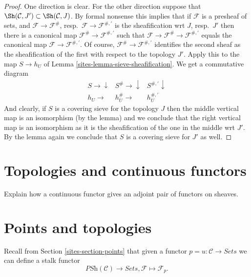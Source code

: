 \begin{proof}

One direction is clear. For the other direction suppose that
$\Sh(\mathcal{C}, J') \subset \Sh(\mathcal{C}, J)$.
By formal nonsense this implies
that if $\mathcal{F}$ is a presheaf of sets,
and $\mathcal{F} \to \mathcal{F}^\#$,
resp.\ $\mathcal{F} \to \mathcal{F}^{\#, \prime}$
is the sheafification wrt $J$, resp.\ $J'$ then there
is a canonical map $\mathcal{F}^\# \to \mathcal{F}^{\#, \prime}$
such that
$\mathcal{F} \to \mathcal{F}^\# \to \mathcal{F}^{\#, \prime}$
equals the canonical map $\mathcal{F} \to \mathcal{F}^{\#, \prime}$.
Of course, $\mathcal{F}^\# \to \mathcal{F}^{\#, \prime}$
identifies the second sheaf as the sheafification of the first
with respect to the topology $J'$.
Apply this to the map $S \to h_U$ of
Lemma \ref{sites-lemma-sieve-sheafification}. We get a commutative
diagram
$$
\begin{array}{ccc}S \longrightarrow\downarrow & S^\# \longrightarrow\downarrow & S^{\#, \prime} \downarrow \\ h_U \longrightarrow & h_U^\# \longrightarrow & h_U^{\#, \prime}\end{array}
$$
And clearly, if $S$ is a covering sieve for the topology $J$
then the middle vertical map is an isomorphism (by the lemma)
and we conclude that the right vertical map is an isomorphism as
it is the sheafification of the one in the middle wrt $J'$.
By the lemma again we conclude that $S$ is a covering sieve
for $J'$ as well.
\end{proof}

\section{Topologies and continuous functors}
\label{sites-section-topologies-continuous-functors}
Explain how a continuous functor gives an adjoint
pair of functors on sheaves.

\section{Points and topologies}
\label{sites-section-points-topologies}
Recall from Section \ref{sites-section-points} that given a functor
$p = u : \mathcal{C} \to \textit{Sets}$ we can define
a stalk functor
$$
\textit{PSh}(\mathcal{C}) \longrightarrow \textit{Sets},
\mathcal{F} \longmapsto \mathcal{F}_p.
$$

